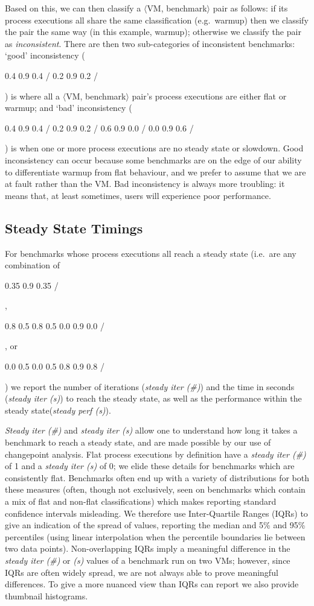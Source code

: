 \documentclass[acmsmall]{acmart}\settopmatter{printfolios=true}
\newcommand{\vmbpair}{$\langle$VM, benchmark$\rangle$\xspace}
\DeclareRobustCommand{\flatc}{%
\setlength{\sparklinethickness}{0.4pt}%
\begin{sparkline}{1.5}
\spark 0.1 0.35
       0.9 0.35
       /%
\end{sparkline}\xspace%
}
\DeclareRobustCommand{\warmup}{%
\setlength{\sparklinethickness}{0.4pt}%
\begin{sparkline}{1.5}
\spark 0.1 0.8
       0.5 0.8
       0.5 0.0
       0.9 0.0
       /%
\end{sparkline}\xspace%
}
\DeclareRobustCommand{\slowdown}{%
\setlength{\sparklinethickness}{0.4pt}%
\begin{sparkline}{1.5}
\spark 0.1 0.0
       0.5 0.0
       0.5 0.8
       0.9 0.8
       /%
\end{sparkline}\xspace%
}
\DeclareRobustCommand{\badinconsistent}{%
\setlength{\sparklinethickness}{0.4pt}%
\begin{sparkline}{1.5}
\spark 0.1 0.4
       0.9 0.4
       /%
\spark 0.1 0.2
       0.9 0.2
       /%
\spark 0.1 0.6
       0.9 0.0
       /%
\spark 0.1 0.0
       0.9 0.6
       /%
\end{sparkline}\xspace%
}
\DeclareRobustCommand{\goodinconsistent}{%
\setlength{\sparklinethickness}{0.4pt}%
\begin{sparkline}{1.5}
\spark 0.1 0.4
       0.9 0.4
       /%
\spark 0.1 0.2
       0.9 0.2
       /%
\end{sparkline}\xspace%
}
\begin{document}
Based on this, we can then classify a \vmbpair pair as follows:
if its process executions all share the same classification (e.g.~warmup) then
we classify the pair the same way (in this example, warmup); otherwise we classify the pair as
\emph{inconsistent}. There are then two sub-categories of inconsistent
benchmarks: `good' inconsistency (\goodinconsistent) is where all a \vmbpair pair's process
executions are either flat or warmup; and `bad' inconsistency (\badinconsistent) is
when one or more process executions are no steady state or slowdown. Good inconsistency
can occur because some benchmarks are on the edge of our ability to differentiate warmup
from flat behaviour, and we prefer to assume that we are at fault rather
than the VM. Bad inconsistency is always more troubling: it
means that, at least sometimes, users will experience poor performance.


\subsection{Steady State Timings}
\label{sec:timings}

For benchmarks whose process executions all reach a steady state (i.e.~are
any combination of \flatc, \warmup, or \slowdown) we report the number of
iterations (\emph{steady iter (\#)}) and the time in seconds (\emph{steady iter (s)}) to
reach the steady state, as well as the performance within the steady
state(\emph{steady perf (s)}).

\emph{Steady iter (\#)} and \emph{steady iter (s)} allow one to understand how long it takes
a benchmark to reach a steady state, and are made possible by our use of changepoint
analysis. Flat process executions by definition have a \emph{steady iter (\#)} of 1 and
a \emph{steady iter (s)} of 0; we elide these details for benchmarks
which are consistently flat. Benchmarks often end up with a variety of distributions
for both these measures (often, though not exclusively, seen on benchmarks
which contain a mix of flat and non-flat classifications) which makes reporting standard confidence intervals
misleading. We therefore use Inter-Quartile Ranges (IQRs) to give an indication of the
spread of values, reporting the median and 5\% and 95\% percentiles (using
linear interpolation when the percentile boundaries lie between two data points).
Non-overlapping IQRs imply a meaningful difference in the \emph{steady iter (\#)} or
\emph{(s)} values of a benchmark run on two VMs; however, since IQRs are often
widely spread, we are not always able to prove meaningful differences. To give a more
nuanced view than IQRs can report we also provide thumbnail histograms.
\end{document}
